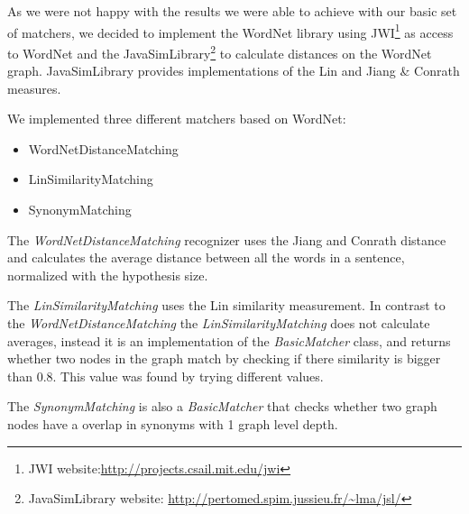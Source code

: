 As we were not happy with the results we were able to achieve with our basic set of matchers, we decided to implement
the WordNet library using JWI\footnote{JWI website:\url{http://projects.csail.mit.edu/jwi}} as access to WordNet and the
JavaSimLibrary\footnote{JavaSimLibrary website: \url{http://pertomed.spim.jussieu.fr/~lma/jsl/}} to calculate distances
on the WordNet graph. JavaSimLibrary provides implementations of the Lin and Jiang \& Conrath measures.

We implemented three different matchers based on WordNet:
\begin{itemize}
    \item WordNetDistanceMatching
    \item LinSimilarityMatching
    \item SynonymMatching
\end{itemize} 

The \textit{WordNetDistanceMatching} recognizer uses the Jiang and Conrath distance and calculates the average distance
between all the words in a sentence, normalized with the hypothesis size.

The \textit{LinSimilarityMatching} uses the Lin similarity measurement. In contrast to the
\textit{WordNetDistanceMatching} the \textit{LinSimilarityMatching} does not calculate averages, instead it is an
implementation of the \textit{BasicMatcher} class, and returns whether two nodes in the graph match by checking if there
similarity is bigger than 0.8. This value was found by trying different values.

The \textit{SynonymMatching} is also a \textit{BasicMatcher} that checks whether two graph nodes have a overlap in synonyms
with 1 graph level depth.
